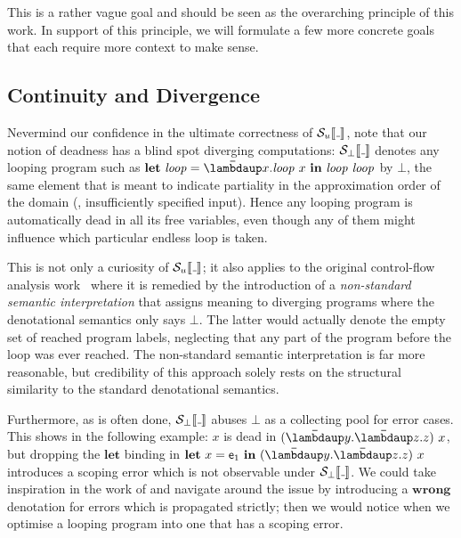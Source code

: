 
This is a rather vague goal and should be seen as the overarching principle of
this work.
In support of this principle, we will formulate a few more concrete goals that
each require more context to make sense.

\subsection{Continuity and Divergence}
\label{sec:continuity}

Nevermind our confidence in the ultimate correctness of $\semusg{\wild}$,
note that our notion of deadness has a blind spot \wrt diverging computations:
$\semscott{\wild}$ denotes any looping program such as
$\Let{\mathit{loop}}{\Lam{x}{\mathit{loop}~x}}{{\mathit{loop}~\mathit{loop}}}$ by $\bot$, the
same element that is meant to indicate partiality in the approximation order
of the domain (\eg, insufficiently specified input).
Hence any looping program is automatically dead in all its free variables, even
though any of them might influence which particular endless loop is taken.

This is not only a curiosity of $\semusg{\wild}$; it also applies to the original
control-flow analysis work~\citep[p. 23]{Shivers:91} where it is remedied
by the introduction of a \emph{non-standard semantic interpretation} that
assigns meaning to diverging programs where the denotational semantics only
says $\bot$.
The latter would actually denote the empty set of reached program labels,
neglecting that any part of the program before the loop was ever reached.
The non-standard semantic interpretation is far more reasonable, but credibility
of this approach solely rests on the structural similarity to the standard
denotational semantics.

Furthermore, as is often done, $\semscott{\wild}$ abuses $\bot$ as a collecting
pool for error cases.
This shows in the following example:
$x$ is dead in $(\Lam{y}{\Lam{z}{z}})~x$, but dropping the $\mathbf{let}$
binding in $\Let{x}{\pe_1}{(\Lam{y}{\Lam{z}{z}})~x}$
introduces a scoping error which is not observable under $\semscott{\wild}$.
We could take inspiration in the work of \citet{Milner:78}
and navigate around the issue by introducing a $\mathbf{wrong}$ denotation for
errors which is propagated strictly; then we would notice when we optimise a
looping program into one that has a scoping error.

